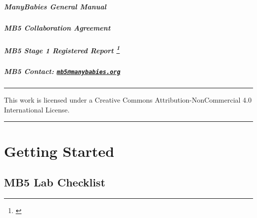 \documentclass[
]{book}
\begin{document}
\paragraph*{ManyBabies General Manual}\label{manybabies-general-manual}

\paragraph*{MB5 Collaboration Agreement}\label{mb5-collaboration-agreement}

\paragraph*{\texorpdfstring{MB5 Stage 1 Registered Report \footnote{\citet{kosiezettersten2024}}}{MB5 Stage 1 Registered Report }}\label{mb5-stage-1-registered-report}

\paragraph*{\texorpdfstring{MB5 Contact: \href{mailto:mb5@manybabies.org}{\nolinkurl{mb5@manybabies.org}} }{MB5 Contact: mb5@manybabies.org }}\label{mb5-contact-mb5manybabies.org}

\begin{center}\rule{0.5\linewidth}{0.5pt}\end{center}

This work is licensed under a Creative Commons Attribution-NonCommercial 4.0 International License.

\begin{center}\rule{0.5\linewidth}{0.5pt}\end{center}

\chapter{Getting Started}\label{getting-started}

\section*{MB5 Lab Checklist}\label{mb5-lab-checklist}
\end{document}
